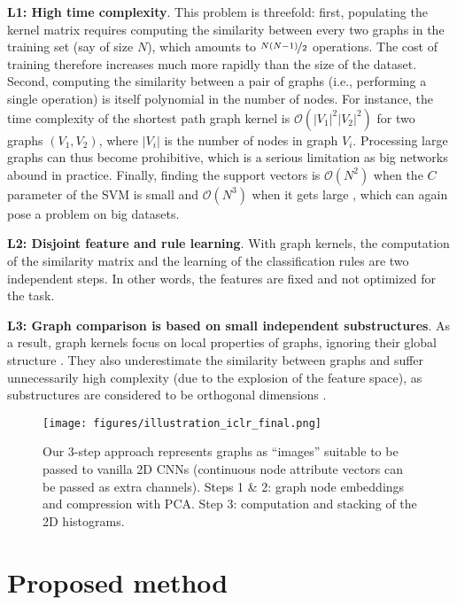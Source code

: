 \documentclass[sigconf]{acmart}
\begin{document}
\textbf{L1: High time complexity}. This problem is threefold: first, populating the kernel matrix requires computing the similarity between every two graphs in the training set (say of size $N$), which amounts to $\nicefrac{N(N-1)}{2}$ operations. The cost of training therefore increases much more rapidly than the size of the dataset. Second, computing the similarity between a pair of graphs (i.e., performing a single operation) is itself polynomial in the number of nodes. For instance, the time complexity of the shortest path graph kernel is $\mathcal{O} (|V_{1}|^2|V_{2}|^2)$ for two graphs $(V_{1},V_{2})$, where $|V_{i}|$ is the number of nodes in graph $V_{i}$. Processing large graphs can thus become prohibitive, which is a serious limitation as big networks abound in practice. Finally, finding the support vectors is $\mathcal{O}(N^2)$ when the $C$ parameter of the SVM is small and $\mathcal{O}(N^3)$ when it gets large \citep{bottou2007support}, which can again pose a problem on big datasets.

\textbf{L2: Disjoint feature and rule learning}. With graph kernels, the computation of the similarity matrix and the learning of the classification rules are two independent steps. In other words, the features are fixed and not optimized for the task.

\textbf{L3: Graph comparison is based on small independent substructures}. As a result, graph kernels focus on local properties of graphs, ignoring their global structure \citep{nikolentzos2017matching}. They also underestimate the similarity between graphs and suffer unnecessarily high complexity (due to the explosion of the feature space), as substructures are considered to be orthogonal dimensions \citep{yanardag2015deep}.

\begin{figure*}[ht!]
  \centering
    \texttt{[image: figures/illustration\_iclr\_final.png]}
\captionsetup{justification=justified,size=small}
    \caption{Our 3-step approach represents graphs as ``images'' suitable to be passed to vanilla 2D CNNs (continuous node attribute vectors can be passed as extra channels). Steps 1 \& 2: graph node embeddings and compression with PCA. Step 3: computation and stacking of the 2D histograms.}
\label{fig:overview}
\end{figure*}

\section{Proposed method}
\end{document}

